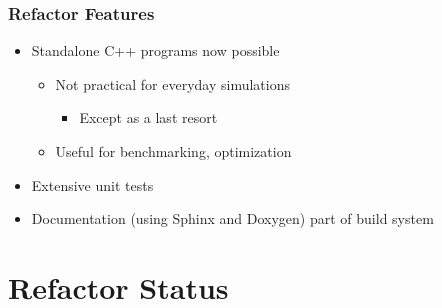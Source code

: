 \documentclass{beamer}
\begin{document}
\begin{frame}
 \frametitle{Refactor Features}
  

\begin{itemize}
  \item Standalone C++ programs now possible
\begin{itemize}
  \item Not practical for everyday simulations
\begin{itemize}
  \item Except as a last resort
\end{itemize}
  \item Useful for benchmarking, optimization
\end{itemize}
  \item Extensive unit tests
  \item Documentation (using Sphinx and Doxygen) part of build system
\end{itemize}

  
 \end{frame}

\section{Refactor Status}
\end{document}
